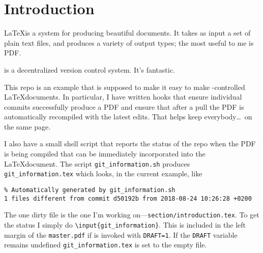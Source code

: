 \section{Introduction}

\LaTeX is a system for producing beautiful documents.
It takes as input a set of plain text files, and produces a variety of output types; the most useful to me is PDF.

\git is a decentralized version control system.
It's fantastic.

This repo is an example that is supposed to make it easy to make \git-controlled \LaTeX documents.
In particular, I have written \git hooks that ensure individual commits successfully produce a PDF and ensure that after a pull the PDF is automatically recompiled with the latest edits.
That helps keep everybody\ldots\ on the same page.

I also have a small shell script that reports the status of the repo when the PDF is being compiled that can be immediately incorporated into the \LaTeX document.
The script \texttt{git\_information.sh} produces \texttt{git\_information.tex} which looks, in the current example, like
\begin{verbatim}
% Automatically generated by git_information.sh
1 files different from commit d50192b from 2018-08-24 10:26:28 +0200
\end{verbatim}
The one dirty file is the one I'm working on---\texttt{section/introduction.tex}.
To get the \git status I simply do \texttt{\textbackslash{}input\{git\_information\}}.
This is included in the left margin of the \texttt{master.pdf} if \make is invoked with \texttt{DRAFT=1}.
If the \texttt{DRAFT} variable remains undefined \texttt{git\_information.tex} is set to the empty file.
